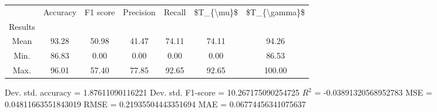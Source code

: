 \begin{tabular}{|c|c|c|c|c|c|c|}
\toprule
{} &  Accuracy &  F1 score &  Precision &  Recall &  \$T\_\{\textbackslash mu\}\$ &  \$T\_\{\textbackslash gamma\}\$ \\
Results &           &           &            &         &            &               \\
\hline
Mean    &     93.28 &     50.98 &      41.47 &   74.11 &      74.11 &         94.26 \\
Min.    &     86.83 &      0.00 &       0.00 &    0.00 &       0.00 &         86.53 \\
Max.    &     96.01 &     57.40 &      77.85 &   92.65 &      92.65 &        100.00 \\
\bottomrule
\end{tabular}

 Dev. std. accuracy = 1.87611090116221
 Dev. std. F1-score = 10.267175090254725
 $R^2$ = -0.03891320568952783
 MSE = 0.04811663551843019
 RMSE = 0.21935504443351694
 MAE = 0.06774456341075637